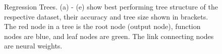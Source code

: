 \documentclass[11pt,a4paper]{article}
\begin{document}
    \begin{figure}
        \centering
        \caption{Regression Trees. (a) - (e) show best performing tree structure of the respective dataset, their accuracy and tree size shown in brackets. The red node in a tree is the root node (output node), function nodes are blue,  and leaf nodes are green. The link connecting nodes are neural weights.
            \label{fig:tree_image_reg}}
    \end{figure} 
    
    
    
\end{document}
